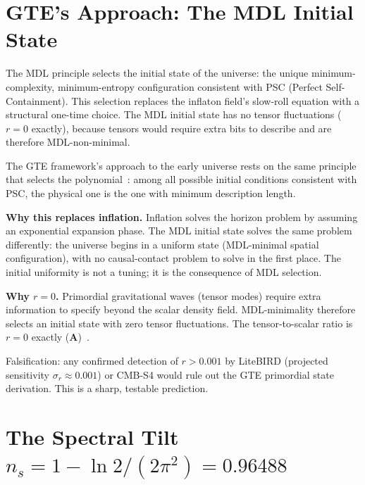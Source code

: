 \documentclass[11pt,a4paper]{article}
\newcommand{\CatA}{\textbf{A}}
\begin{document}
\section{GTE's Approach: The MDL Initial State}
\label{sec:mdl-ic}

\begin{tcolorbox}[colback=boxgreen,colframe=green!50!black,
  title=Why there is no inflation field]
The MDL principle selects the initial state of the universe: the unique
minimum-complexity, minimum-entropy configuration consistent with PSC
(Perfect Self-Containment).
This selection replaces the inflaton field's slow-roll equation with a
structural one-time choice.
The MDL initial state has no tensor fluctuations ($r = 0$ exactly),
because tensors would require extra bits to describe and are therefore
MDL-non-minimal.
\end{tcolorbox}

The GTE framework's approach to the early universe rests on the same
principle that selects the polynomial~\cite{SpivackGTECosmology,SpivackGTECompleteFramework}:
among all possible initial conditions consistent with PSC, the physical
one is the one with minimum description length.

\textbf{Why this replaces inflation.}
Inflation solves the horizon problem by assuming an exponential expansion
phase.
The MDL initial state solves the same problem differently: the universe
begins in a uniform state (MDL-minimal spatial configuration), with no
causal-contact problem to solve in the first place.
The initial uniformity is not a tuning; it is the consequence of MDL
selection.

\textbf{Why $r = 0$.}
Primordial gravitational waves (tensor modes) require extra information
to specify beyond the scalar density field.
MDL-minimality therefore selects an initial state with zero tensor
fluctuations.
The tensor-to-scalar ratio is $r = 0$ exactly (\CatA)~\cite{SpivackGTECompleteFramework}.

Falsification: any confirmed detection of $r > 0.001$ by LiteBIRD
(projected sensitivity $\sigma_r \approx 0.001$) or CMB-S4 would rule
out the GTE primordial state derivation.
This is a sharp, testable prediction.

\section{The Spectral Tilt $n_s = 1 - \ln2/(2\pi^2) = 0.96488$}
\label{sec:ns}
\end{document}
